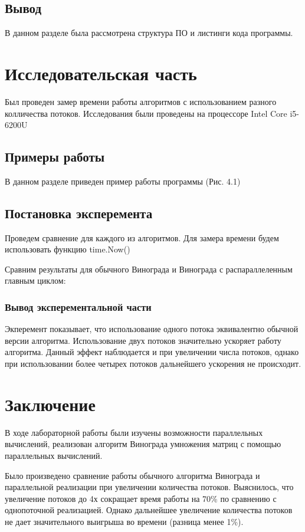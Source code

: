 \documentclass[12pt]{report}
\begin{document}
\section{Вывод}
В данном разделе была рассмотрена структура ПО и листинги кода программы.

\chapter{Исследовательская часть}
Был проведен замер времени работы алгоритмов с использованием разного колличества потоков.
Исследования были проведены на процессоре Intel Core i5-6200U
\section{Примеры работы}
В данном разделе приведен пример работы программы (Рис. 4.1)

\section{Постановка эксперемента}
Проведем сравнение для каждого из алгоритмов. Для замера времени будем использовать функцию time.Now()

Сравним результаты для обычного Винограда и Винограда с распараллеленным главным циклом:
\newpage

\newpage
\subsection{Вывод эксперементальной части}
Экперемент показывает, что использование одного потока эквивалентно обычной версии алгоритма. Использование двух потоков значительно ускоряет работу алгоритма. Данный эффект наблюдается и при увеличении числа потоков, однако при использовании более четырех потоков дальнейшего ускорения не происходит.
\chapter*{Заключение}
В ходе лабораторной работы были изучены возможности параллельных вычислений, реализован алгоритм Винограда умножения матриц
с помощью параллельных вычислений.

Было произведено сравнение работы обычного алгоритма Винограда и параллельной реализации при увеличении количества потоков. Выяснилось, что увеличение потоков до 4х сокращает время работы на 70\% по сравнению с
однопоточной реализацией. Однако дальнейшее увеличение количества потоков не дает значительного выигрыша во времени (разница менее 1\%). 
\end{document}
